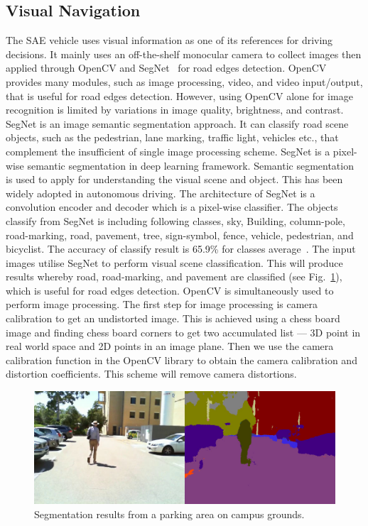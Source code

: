 \subsection{Visual Navigation}\label{sec:6:visual}
The SAE vehicle uses visual information as one of its references for driving decisions. It mainly uses an off-the-shelf monocular camera to collect images then applied through OpenCV and SegNet~\cite{badrinarayanan_segnet:_2017} for road edges detection. OpenCV provides many modules, such as image processing, video, and video input/output, that is useful for road edges detection. However, using OpenCV alone for image recognition is limited by variations in image quality, brightness, and contrast. SegNet is an image semantic segmentation approach. It can classify road scene objects, such as the pedestrian, lane marking, traffic light, vehicles etc., that complement the insufficient of single image processing scheme. SegNet is a pixel-wise semantic segmentation in deep learning framework. Semantic segmentation is used to apply for understanding the visual scene and object. This has been widely adopted in autonomous driving. The architecture of SegNet is a convolution encoder and decoder which is a pixel-wise classifier. The objects classify from SegNet is including following classes, sky, Building, column-pole, road-marking, road, pavement, tree, sign-symbol, fence, vehicle, pedestrian, and bicyclist. The accuracy of classify result is 65.9\% for classes average~\cite{badrinarayanan_segnet:_2017}. The input images utilise SegNet to perform visual scene classification. This will produce results whereby road, road-marking, and pavement are classified (see Fig.~\ref{fig:6:carpark}), which is useful for road edges detection. OpenCV is simultaneously used to perform image processing. The first step for image processing is camera calibration to get an undistorted image. This is achieved using a chess board image and finding chess board corners to get two accumulated list --- 3D point in real world space and 2D points in an image plane. Then we use the camera calibration function in the OpenCV library to obtain the camera calibration and distortion coefficients. This scheme will remove camera distortions.

\begin{figure}[H]
	\centering
	\includegraphics[width=0.8\linewidth]{2}
	\caption{Segmentation results from a parking area on campus grounds.}
	\label{fig:6:carpark}
\end{figure}

